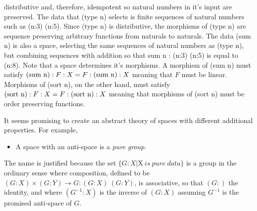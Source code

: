 \documentclass[11pt]{article}
\begin{document}
distributive and, therefore, idempotent so natural numbers in it's input are preserved.   
The data that (type n) selects is finite  
sequences of natural numbers such as (n:3) (n:5).  Since (type n) is distributive, the morphisms 
of (type n) are sequence preserving arbitrary functions from naturals to naturals.   
The data (sum n) is also a space, selecting the same sequences of  natural numbers as (type n), but combining 
sequences with addition so that sum n : (n:3) (n:5) is equal to (n:8).  Note that a space determines it's morphisms.  
A morphism of (sum n) must satisfy $({\rm sum\ n}):F:X = F:({\rm sum\ n}):X$ meaning that $F$ must be linear. 
Morphisms of (sort n), on the other hand, must satisfy $({\rm sort\ n}):F:X=F:({\rm sort\ n}):X$ meaning that 
morphisms of (sort n) must be order preserving functions. 

     It seems promising to create an abstract theory of spaces with different additional properties.  For 
 example, 
\begin{itemize}
\item A space with an anti-space is a {\it pure group}.
\end{itemize}
The name is justified because the set $\{G:X | $X$\ is\ pure\ data\}$ 
is a group in the ordinary sense where composition, defined to be $(G:X)\times(G:Y)\rightarrow G:(G:X)\ (G:Y)$, is associative, so that   
$(G:)$ the identity, and where $(G^{-1}:X)$ is the inverse of $(G:X)$ assuming $G^{-1}$ is the promised anti-space of $G$.  
\end{document}
